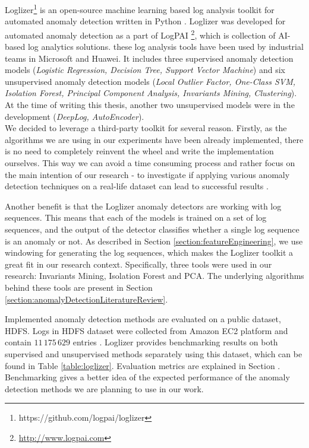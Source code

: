 Loglizer\footnote{https://github.com/logpai/loglizer} is an open-source machine learning based log analysis toolkit for automated anomaly detection written in Python \cite{he2016}. Loglizer was developed for automated anomaly detection as a part of LogPAI \footnote{\url{http://www.logpai.com}}, which is collection of AI-based log analytics solutions. these log analysis tools have been used by industrial teams in Microsoft and Huawei. It includes three supervised anomaly detection models (\textit{Logistic Regression, Decision Tree, Support Vector Machine}) and six unsupervised anomaly detection models (\textit{Local Outlier Factor, One-Class SVM, Isolation Forest, Principal Component Analysis, Invariants Mining, Clustering}). At the time of writing this thesis, another two unsupervised models were in the development (\textit{DeepLog, AutoEncoder}). \\

We decided to leverage a third-party toolkit for several reason. Firstly, as the algorithms we are using in our experiments have been already implemented, there is no need to completely reinvent the wheel and write the implementation ourselves. This way we can avoid a time consuming process and rather focus on the main intention of our research - to investigate if applying various anomaly detection techniques on a real-life dataset can lead to successful results .

Another benefit is that the Loglizer anomaly detectors are working with log sequences. This means that each of the models is trained on a set of log sequences, and the output of the detector classifies whether a single log sequence is an anomaly or not. As described in Section \ref{section:featureEngineering}, we use windowing for generating the log sequences, which makes the Loglizer toolkit a great fit in our research context. Specifically, three  tools were used in our research: Invariants Mining, Isolation Forest and PCA. The underlying algorithms behind these tools are present in Section \ref{section:anomalyDetectionLiteratureReview}.

Implemented anomaly detection methods are evaluated on a public dataset, HDFS. Logs in HDFS dataset were collected from Amazon EC2 platform and contain $11\,175\,629$ entries \cite{xu2009}. Loglizer provides benchmarking results on both supervised and unsupervised methods separately using this dataset, which can be found in Table \ref{table:loglizer}. Evaluation metrics are explained in Section . Benchmarking gives a better idea of the expected performance of the anomaly detection methods we are planning to use in our work. 

